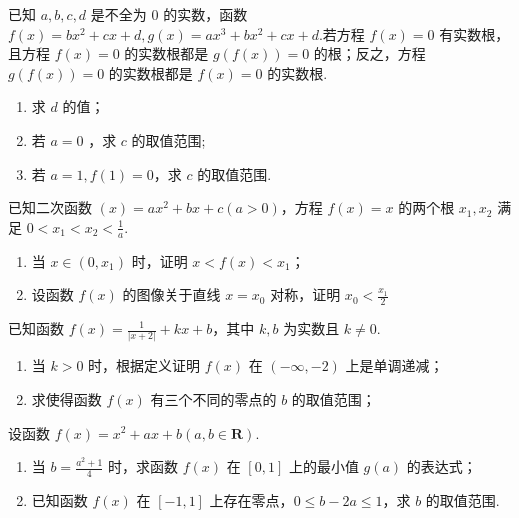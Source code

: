 \documentclass[a4paper , final]{ctexart}
\newenvironment{problem}[1]{%
  \item #1
  \par
  \vspace{8cm}
}{}
\begin{document}
\begin{problems}
    \newpage
    \begin{problem}
        {
            已知 $ a,b,c,d$ 是不全为 $ 0$ 的实数，函数 $ f(x) = bx^2+cx+d,g(x) = ax^3+bx^2+cx+d$.若方程 $ f(x) = 0$ 有实数根，且方程 $ f(x) = 0$ 的实数根都是 $ g(f(x)) = 0$ 的根；反之，方程 $ g(f(x)) = 0$ 的实数根都是 $ f(x) = 0$ 的实数根.
            \begin{enumerate}[label=(\arabic*)]
                \item 求 $ d$ 的值；
                \item 若 $ a =0$ ，求 $ c$ 的取值范围;
                \item 若 $ a = 1,f(1) = 0$，求 $ c$ 的取值范围.
            \end{enumerate}
        }
        \vspace{4cm}
    \end{problem}

    \begin{problem}
        {
            已知二次函数 $ (x) = ax^2+bx+c(a>0)$，方程 $ f(x) = x$ 的两个根 $x_1,x_2$ 满足 $0<x_1<x_2<\frac{1}{a}$.
            \begin{enumerate}[label=(\arabic*)]
                \item 当 $ x\in (0,x_1)$ 时，证明 $ x<f(x)<x_1$；
                \item 设函数 $f(x)$ 的图像关于直线 $ x=x_0$ 对称，证明 $ x_0 < \frac{x_1}{2}$
            \end{enumerate}
        }
    \end{problem}

    \begin{problem}
        {
            已知函数 $ f(x) = \frac{1}{\vert x+2 \vert} +kx+b$，其中 $k,b$ 为实数且 $k\neq 0$.
            \begin{enumerate}[label=(\arabic*)]
                \item 当 $ k > 0$ 时，根据定义证明 $ f(x)$ 在 $ (-\infty, -2)$ 上是单调递减；
                \item 求使得函数 $f(x)$ 有三个不同的零点的 $b$ 的取值范围；
            \end{enumerate}
        }
    \end{problem}
    
    \begin{problem}
        {
            设函数 $ f(x) = x^2 +ax+b(a,b\in \mathbf{R})$.
            \begin{enumerate}[label=(\arabic*)]
                \item 当 $ b = \frac{a^2+1}{4}$ 时，求函数 $ f(x)$ 在 $ [0,1]$ 上的最小值 $ g(a)$ 的表达式；
                \item 已知函数 $ f(x)$ 在 $ [-1,1]$ 上存在零点，$ 0\leq b-2a\leq 1$，求 $ b$ 的取值范围.
            \end{enumerate}
        }
    \end{problem}
\end{problems}
\end{document}
